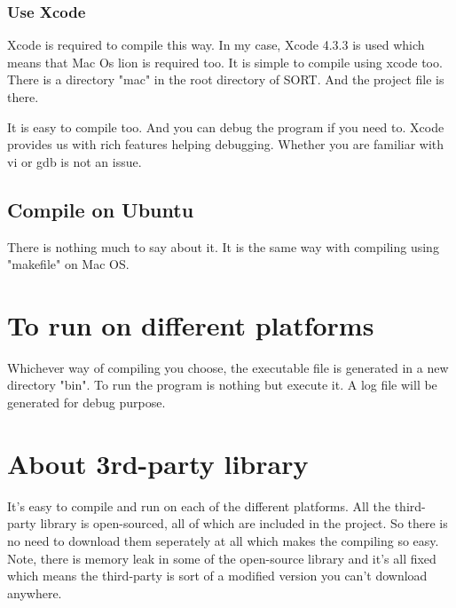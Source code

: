 \documentclass[10pt,a4paper]{article}
\begin{document}
\subsubsection{ Use Xcode }
Xcode is required to compile this way.
In my case, Xcode 4.3.3 is used which means that Mac Os lion is required too.
It is simple to compile using xcode too.
There is a directory "mac" in the root directory of SORT.
And the project file is there.

It is easy to compile too.
And you can debug the program if you need to.
Xcode provides us with rich features helping debugging.
Whether you are familiar with vi or gdb is not an issue.

\subsection{ Compile on Ubuntu }
There is nothing much to say about it.
It is the same way with compiling using "makefile" on Mac OS.

\section{ To run on different platforms }
Whichever way of compiling you choose, the executable file is generated in a new directory "bin".
To run the program is nothing but execute it.
A log file will be generated for debug purpose.

\section{ About 3rd-party library }
It's easy to compile and run on each of the different platforms.
All the third-party library is open-sourced, all of which are included in the project.
So there is no need to download them seperately at all which makes the compiling so easy.
Note, there is memory leak in some of the open-source library and it's all fixed which means the third-party is sort of a modified version you can't download anywhere.
\end{document}
